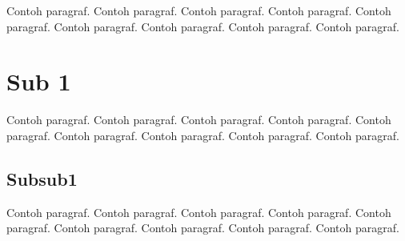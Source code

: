 \documentclass[twoside,bahasa]{tufte-book}
\begin{document}
Contoh paragraf. Contoh paragraf. Contoh paragraf. Contoh paragraf.
Contoh paragraf. Contoh paragraf. Contoh paragraf. Contoh paragraf.
Contoh paragraf.

\section{Sub 1}

Contoh paragraf. Contoh paragraf. Contoh paragraf. Contoh paragraf.
Contoh paragraf. Contoh paragraf. Contoh paragraf. Contoh paragraf.
Contoh paragraf.

\subsection{Subsub1}

Contoh paragraf. Contoh paragraf. Contoh paragraf. Contoh paragraf.
Contoh paragraf. Contoh paragraf. Contoh paragraf. Contoh paragraf.
Contoh paragraf.
\end{document}
